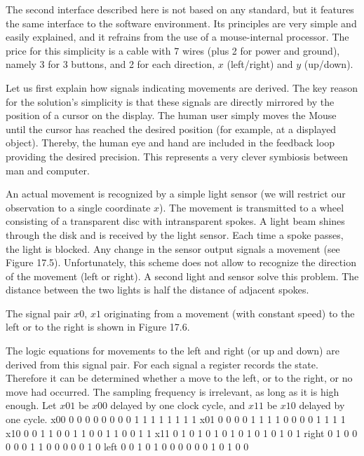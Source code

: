{The second interface described here is not based on any standard, but it features the same interface to the software environment. Its principles are very simple and easily explained, and it refrains from the use of a mouse-internal processor. The price for this simplicity is a cable with 7 wires (plus 2 for power and ground), namely 3 for 3 buttons, and 2 for each direction, $x$ (left/right) and $y$ (up/down).

Let us first explain how signals indicating movements are derived. The key reason for the solution's simplicity is that these signals are directly mirrored by the position of a cursor on the display. The human user simply moves the Mouse until the cursor has reached the desired position (for example, at a displayed object). Thereby, the human eye and hand are included in the feedback loop providing the desired precision. This represents a very clever symbiosis between man and computer.

An actual movement is recognized by a simple light sensor (we will restrict our observation to a single coordinate $x$). The movement is transmitted to a wheel consisting of a transparent disc with intransparent spokes. A light beam shines through the disk and is received by the light sensor. Each time a spoke passes, the light is blocked. Any change in the sensor output signals a movement (see Figure 17.5). Unfortunately, this scheme does not allow to recognize the direction of the movement (left or right). A second light and sensor solve this problem. The distance between the two lights is half the distance of adjacent spokes.


The signal pair $x0$, $x1$ originating from a movement (with constant speed) to the left or to the right is shown in Figure 17.6.


The logic equations for movements to the left and right (or up and down) are derived from this signal pair. For each signal a register records the state. Therefore it can be determined whether a move to the left, or to the right, or no move had occurred. The sampling frequency is irrelevant, as long as it is high enough. Let $x01$ be $x00$ delayed by one clock cycle, and $x11$ be $x10$ delayed by one cycle.
\begintt
x00    0 0 0 0 0 0 0 0 1 1 1 1 1 1 1 1
x01    0 0 0 0 1 1 1 1 0 0 0 0 1 1 1 1
x10    0 0 1 1 0 0 1 1 0 0 1 1 0 0 1 1
x11    0 1 0 1 0 1 0 1 0 1 0 1 0 1 0 1
right  0 1 0 0 0 0 0 1 1 0 0 0 0 0 1 0
left   0 0 1 0 1 0 0 0 0 0 0 1 0 1 0 0
\endtt

}
